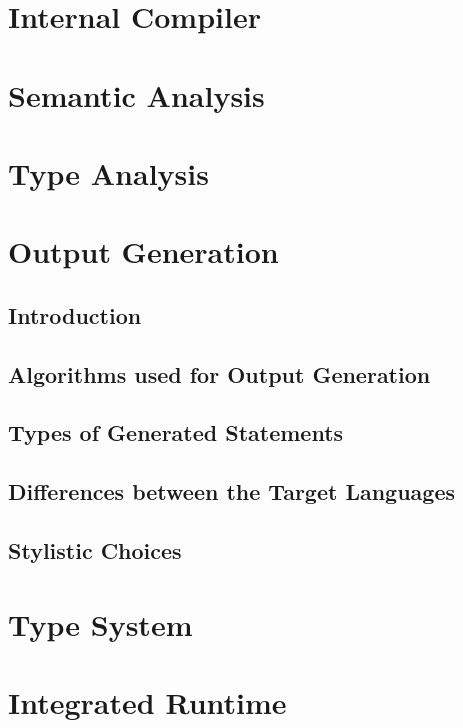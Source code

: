 \section{Internal Compiler}

\section{Semantic Analysis}

\section{Type Analysis}

\section{Output Generation}

\subsection{Introduction}

\subsection{Algorithms used for Output Generation}

\subsection{Types of Generated Statements}

\subsection{Differences between the Target Languages}

\subsection{Stylistic Choices}

\section{Type System}

\section{Integrated Runtime}

